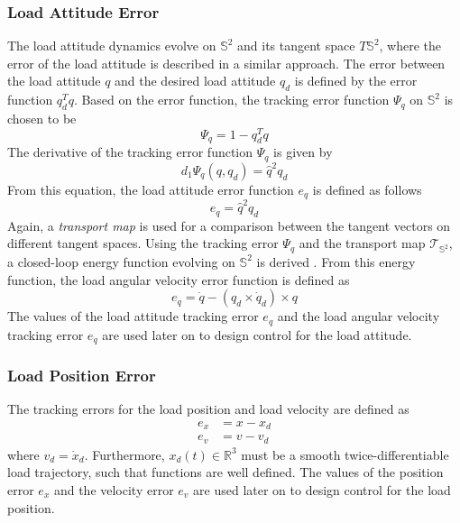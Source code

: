 \subsubsection*{Load Attitude Error}
The load attitude dynamics evolve on $ \mathbb{S}^2 $ and its tangent space $ T\mathbb{S}^2 $, where the error of the load attitude is described in a similar approach.
The error between the load attitude $ q $ and the desired load attitude $ q_d $ is defined by the error function $ q_d^Tq $. Based on the error function, the tracking error function $ \Psi_q $ on $ \mathbb{S}^2 $ is chosen to be
\begin{equation}\label{eq:psiq}
\Psi_q=1-q_d^Tq
\end{equation}
The derivative of the tracking error function $ \Psi_q $ is given by 
\begin{equation}\label{key}
d_1\Psi_q(q,q_d)=\hat{q}^2q_d
\end{equation}
From this equation, the load attitude error function $ e_q $ is defined as follows
\begin{equation}\label{eq:con.eq}
e_q=\hat{q}^2q_d
\end{equation}
Again, a \textit{transport map} is used for a comparison between the tangent vectors on different tangent spaces.
Using the tracking error $ \Psi_q $ and the transport map $ \mathcal{T}_{\mathbb{S}^2} $, a closed-loop energy function evolving on $ \mathbb{S}^2 $ is derived \cite[11.3.2]{Bullo2005}. From this energy function, the load angular velocity error function is defined as
\begin{equation}\label{eq:con.edq}
e_{\dot{q}}=\dot{q}-(q_d\times\dot{q}_d)\times q
\end{equation}
The values of the load attitude tracking error $ e_q $ and the load angular velocity tracking error $ e_{\dot{q}}$ 
are used later on to design control for the load attitude.

\subsubsection*{Load Position Error}
The tracking errors for the load position and load velocity are defined as
\begin{align}\label{key}
e_x&=x-x_d\\
e_v&=v-v_d
\end{align}
where $ v_d=\dot{x}_d $. Furthermore, $ x_d(t) \in \mathbb{R}^3$ must be a smooth twice-differentiable load trajectory, such that functions are well defined. The values of the position error $ e_x$ and the velocity error $ e_v $ are used later on to design control for the load position.

